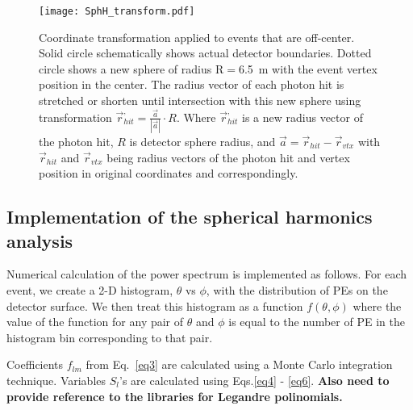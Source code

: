 \begin{figure*}[h]
  \centering
  \texttt{[image: SphH\_transform.pdf]}
  \caption{Coordinate transformation applied to events that are
    off-center. Solid circle schematically shows actual detector
    boundaries. Dotted circle shows a new sphere of radius R$=$6.5~m
    with the event vertex position in the center. The radius vector of
    each photon hit is stretched or shorten until intersection with
    this new sphere using transformation $\vec{r}^{,}_{hit} =
    \frac{\vec{a}}{|\vec{a}|} \cdot R$. Where $\vec{r}^{,}_{hit}$ is a
    new radius vector of the photon hit, $R$ is detector sphere radius,
    and $\vec{a}=\vec{r}_{hit} - \vec{r}_{vtx}$ with $\vec{r}_{hit}$
    and $\vec{r}_{vtx}$ being radius vectors of the photon hit and
    vertex position in original coordinates and correspondingly.}
  \label{fig:SphH_transform}
\end{figure*}


\subsection{Implementation of the spherical harmonics analysis}

Numerical calculation of the power spectrum is implemented as follows.
For each event, we create a 2-D histogram, $\theta$ vs $\phi$, with the distribution of PEs on the detector surface. We then treat this 
histogram as a function $f(\theta,\phi)$ where the value of the function for any pair of $\theta$ and $\phi$ is equal to the number of 
PE in the histogram bin corresponding to that pair.

Coefficients $f_{lm}$ from Eq.~\ref{eq3} are calculated using a Monte Carlo integration technique. Variables $S_l$'s are calculated using 
Eqs.\ref{eq4} - \ref{eq6}. {\bf Also need to provide reference to the libraries for Legandre polinomials.}

